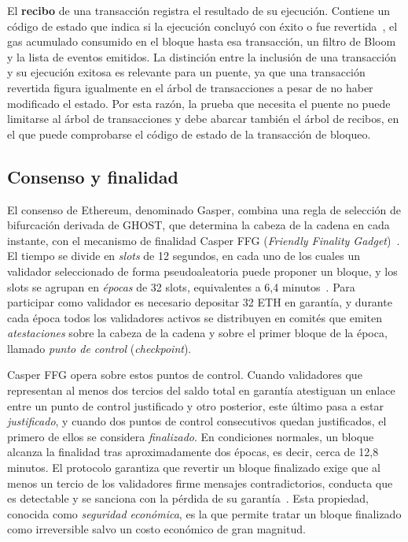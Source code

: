 El \textbf{recibo} de una transacción registra el resultado de su ejecución. Contiene un código
de estado que indica si la ejecución concluyó con éxito o fue revertida~\cite{eip658}, el gas
acumulado consumido en el bloque hasta esa transacción, un filtro de Bloom y la lista de eventos
emitidos. La distinción entre la inclusión de una transacción y su ejecución exitosa es
relevante para un puente, ya que una transacción revertida figura igualmente en el árbol de
transacciones a pesar de no haber modificado el estado. Por esta razón, la prueba que necesita el
puente no puede limitarse al árbol de transacciones y debe abarcar también el árbol de recibos,
en el que puede comprobarse el código de estado de la transacción de bloqueo.

\subsection{Consenso y finalidad}
\label{sec:eth_consenso}

El consenso de Ethereum, denominado Gasper, combina una regla de selección de bifurcación
derivada de GHOST, que determina la cabeza de la cadena en cada instante, con el mecanismo de
finalidad Casper FFG (\textit{Friendly Finality Gadget})~\cite{buterin2020gasper,
buterin2017casper}. El tiempo se divide en \textit{slots} de 12 segundos, en cada uno de los
cuales un validador seleccionado de forma pseudoaleatoria puede proponer un bloque, y los slots
se agrupan en \textit{épocas} de 32 slots, equivalentes a 6,4 minutos~\cite{ethconsensusphase0}.
Para participar como validador es necesario depositar 32 ETH en garantía, y durante cada época
todos los validadores activos se distribuyen en comités que emiten \textit{atestaciones} sobre
la cabeza de la cadena y sobre el primer bloque de la época, llamado \textit{punto de control}
(\textit{checkpoint}).

Casper FFG opera sobre estos puntos de control. Cuando validadores que representan al menos dos
tercios del saldo total en garantía atestiguan un enlace entre un punto de control justificado y
otro posterior, este último pasa a estar \textit{justificado}, y cuando dos puntos de control
consecutivos quedan justificados, el primero de ellos se considera \textit{finalizado}. En
condiciones normales, un bloque alcanza la finalidad tras aproximadamente dos épocas, es decir,
cerca de 12,8 minutos. El protocolo garantiza que revertir un bloque finalizado exige que al menos
un tercio de los validadores firme mensajes contradictorios, conducta que es detectable y se
sanciona con la pérdida de su garantía~\cite{buterin2017casper}. Esta propiedad, conocida como
\textit{seguridad económica}, es la que permite tratar un bloque finalizado como irreversible
salvo un costo económico de gran magnitud.

